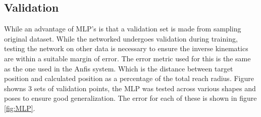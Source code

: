\documentclass[a4paper,11pt]{article}
\begin{document}
\subsection{Validation}

While an advantage of MLP's is that a validation set is made from sampling original dataset. While the networked undergoes validation during training, testing the network on other data is necessary to ensure the inverse kinematics are within a suitable margin of error.
The error metric used for this is the same as the one used in the Anfis system. Which is the distance between target position and calculated position as a percentage of the total reach radius.
Figure showns 3 sets of validation points, the MLP was tested across various shapes and poses to ensure good generalization. The error for each of these is shown in figure \ref{fig:MLP}.
\end{document}
